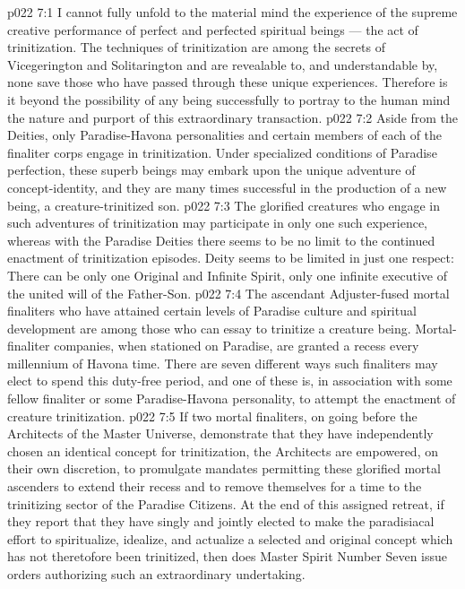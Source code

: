 \vs p022 7:1 I cannot fully unfold to the material mind the experience of the supreme creative performance of perfect and perfected spiritual beings --- the act of trinitization. The techniques of trinitization are among the secrets of Vicegerington and Solitarington and are revealable to, and understandable by, none save those who have passed through these unique experiences. Therefore is it beyond the possibility of any being successfully to portray to the human mind the nature and purport of this extraordinary transaction.
\vs p022 7:2 Aside from the Deities, only Paradise\hyp{}Havona personalities and certain members of each of the finaliter corps engage in trinitization. Under specialized conditions of Paradise perfection, these superb beings may embark upon the unique adventure of concept\hyp{}identity, and they are many times successful in the production of a new being, a creature\hyp{}trinitized son.
\vs p022 7:3 The glorified creatures who engage in such adventures of trinitization may participate in only one such experience, whereas with the Paradise Deities there seems to be no limit to the continued enactment of trinitization episodes. Deity seems to be limited in just one respect: There can be only one Original and Infinite Spirit, only one infinite executive of the united will of the Father\hyp{}Son.
\vs p022 7:4 The ascendant Adjuster\hyp{}fused mortal finaliters who have attained certain levels of Paradise culture and spiritual development are among those who can essay to trinitize a creature being. Mortal\hyp{}finaliter companies, when stationed on Paradise, are granted a recess every millennium of Havona time. There are seven different ways such finaliters may elect to spend this duty\hyp{}free period, and one of these is, in association with some fellow finaliter or some Paradise\hyp{}Havona personality, to attempt the enactment of creature trinitization.
\vs p022 7:5 If two mortal finaliters, on going before the Architects of the Master Universe, demonstrate that they have independently chosen an identical concept for trinitization, the Architects are empowered, on their own discretion, to promulgate mandates permitting these glorified mortal ascenders to extend their recess and to remove themselves for a time to the trinitizing sector of the Paradise Citizens. At the end of this assigned retreat, if they report that they have singly and jointly elected to make the paradisiacal effort to spiritualize, idealize, and actualize a selected and original concept which has not theretofore been trinitized, then does Master Spirit Number Seven issue orders authorizing such an extraordinary undertaking.

